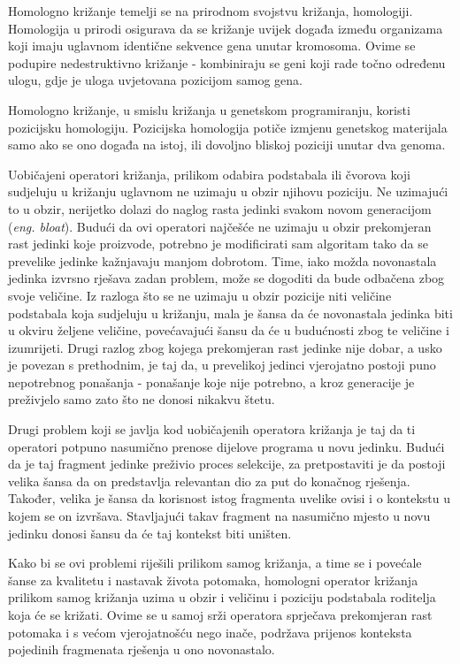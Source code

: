 Homologno križanje \cite{crxSizeFair} temelji se na prirodnom svojstvu križanja, homologiji. Homologija u prirodi osigurava da se križanje uvijek događa između organizama koji imaju uglavnom identične sekvence gena unutar kromosoma. Ovime se podupire nedestruktivno križanje - kombiniraju se geni koji rade točno određenu ulogu, gdje je uloga uvjetovana pozicijom samog gena.

Homologno križanje, u smislu križanja u genetskom programiranju, koristi pozicijsku homologiju. Pozicijska homologija potiče izmjenu genetskog materijala samo ako se ono događa na istoj, ili dovoljno bliskoj poziciji unutar dva genoma.

Uobičajeni operatori križanja, prilikom odabira podstabala ili čvorova koji sudjeluju u križanju uglavnom ne uzimaju u obzir njihovu poziciju. Ne uzimajući to u obzir, nerijetko dolazi do naglog rasta jedinki svakom novom generacijom (\textit{eng. bloat}). Budući da ovi operatori najčešće ne uzimaju u obzir prekomjeran rast jedinki koje proizvode, potrebno je modificirati sam algoritam tako da se prevelike jedinke kažnjavaju manjom dobrotom. Time, iako možda novonastala jedinka izvrsno rješava zadan problem, može se dogoditi da bude odbačena zbog svoje veličine. Iz razloga što se ne uzimaju u obzir pozicije niti veličine podstabala koja sudjeluju u križanju, mala je šansa da će novonastala jedinka biti u okviru željene veličine, povećavajući šansu da će u budućnosti zbog te veličine i izumrijeti. Drugi razlog zbog kojega prekomjeran rast jedinke nije dobar, a usko je povezan s prethodnim, je taj da, u prevelikoj jedinci vjerojatno postoji puno nepotrebnog ponašanja - ponašanje koje nije potrebno, a kroz generacije je preživjelo samo zato što ne donosi nikakvu štetu.

Drugi problem koji se javlja kod uobičajenih operatora križanja je taj da ti operatori potpuno nasumično prenose dijelove programa u novu jedinku. Budući da je taj fragment jedinke preživio proces selekcije, za pretpostaviti je da postoji velika šansa da on predstavlja relevantan dio za put do konačnog rješenja. Također, velika je šansa da korisnost istog fragmenta uvelike ovisi i o kontekstu u kojem se on izvršava. Stavljajući takav fragment na nasumično mjesto u novu jedinku donosi šansu da će taj kontekst biti uništen.

Kako bi se ovi problemi riješili prilikom samog križanja, a time se i povećale šanse za kvalitetu i nastavak života potomaka, homologni operator križanja prilikom samog križanja uzima u obzir i veličinu i poziciju podstabala roditelja koja će se križati. Ovime se u samoj srži operatora sprječava prekomjeran rast potomaka i s većom vjerojatnošću nego inače, podržava prijenos konteksta pojedinih fragmenata rješenja u ono novonastalo.

